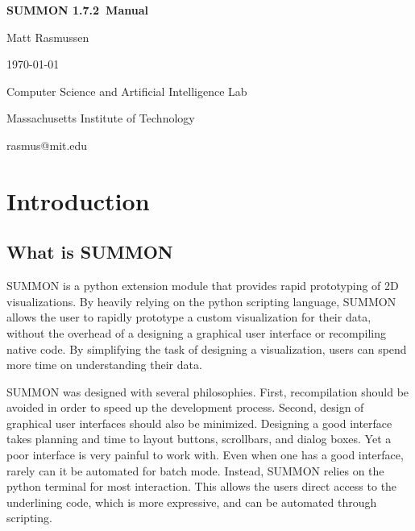 \documentclass[12pt]{article}
\newcommand{\version}{1.7.2}
\begin{document}
\begin{titlepage}

\begin{center}

\vspace*{2.5in}

{\huge \bf {}\selectfont 
SUMMON \version\ Manual
}
\vspace*{.5in}

{\large
Matt Rasmussen

\today
}
\vspace*{.5in}

Computer Science and Artificial Intelligence Lab

Massachusetts Institute of Technology

\vspace*{.25in}

rasmus@mit.edu
\end{center}

\end{titlepage}


\tableofcontents

\clearpage

\section{Introduction}
\label{sec:intro}


\subsection{What is SUMMON}

SUMMON is a python extension module that provides rapid prototyping of 2D
visualizations.  By heavily relying on the python scripting language, SUMMON
allows the user to rapidly prototype a custom visualization for their data, 
without the overhead of a designing a graphical user interface or recompiling 
native code.  By simplifying the task of designing a visualization, users can 
spend more time on understanding their data. 

SUMMON was designed with several philosophies.  First, recompilation should
be avoided in order to speed up the development process.  Second, design of
graphical user interfaces should also be minimized.  Designing a good interface
takes planning and time to layout buttons, scrollbars, and dialog boxes.  Yet a 
poor interface is very painful to work with. Even when one has a good interface,
rarely can it be automated for batch mode.  Instead, SUMMON relies on the python
terminal for most interaction.  This allows the users direct access to  the
underlining code, which is more expressive, and can be automated through
scripting.  
\end{document}
